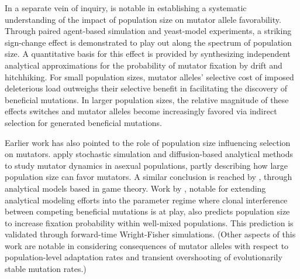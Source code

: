 In a separate vein of inquiry, \citet{raynes2018sign} is notable in establishing a systematic understanding of the impact of population size on mutator allele favorability.
Through paired agent-based simulation and yeast-model experiments, a striking sign-change effect is demonstrated to play out along the spectrum of population size.
A quantitative basis for this effect is provided by synthesizing independent analytical approximations for the probability of mutator fixation by drift and hitchhiking.
For small population sizes, mutator alleles' selective cost of imposed deleterious load outweighs their selective benefit in facilitating the discovery of beneficial mutations.
In larger population sizes, the relative magnitude of these effects switches and mutator alleles become increasingly favored via indirect selection for generated beneficial mutations.

Earlier work has also pointed to the role of population size influencing selection on mutators.
\citet{wylie2009fixation} apply stochastic simulation and diffusion-based analytical methods to study mutator dynamics in asexual populations, partly describing how large population size can favor mutators.
A similar conclusion is reached by \citet{andre2006evolution}, through analytical models based in game theory.
Work by \citet{good2016evolution}, notable for extending analytical modeling efforts into the parameter regime where clonal interference between competing beneficial mutations is at play, also predicts population size to increase fixation probability within well-mixed populations.
This prediction is validated through forward-time Wright-Fisher simulations.
(Other aspects of this work are notable in considering consequences of mutator alleles with respect to population-level adaptation rates and transient overshooting of evolutionarily stable mutation rates.)

